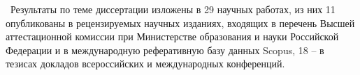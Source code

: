 

\publications\ Результаты по теме диссертации изложены в 29 научных работах, из них 11 опубликованы в рецензируемых научных изданиях, входящих в перечень Высшей аттестационной комиссии при Министерстве образования и науки Российской Федерации и в международную реферативную базу данных Scopus, 18 -- в тезисах докладов всероссийских и международных конференций. %
